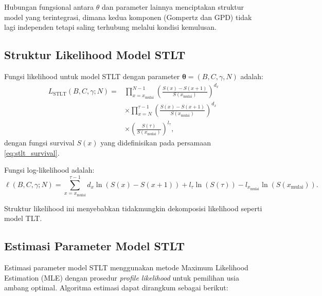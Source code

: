 Hubungan fungsional antara $\theta$ dan parameter lainnya menciptakan struktur model yang terintegrasi, dimana kedua komponen (Gompertz dan GPD) tidak lagi independen tetapi saling terhubung melalui kondisi kemulusan.

\subsection{Struktur Likelihood Model STLT}

Fungsi likelihood untuk model STLT dengan parameter $\boldsymbol{\theta} = (B, C, \gamma, N)$ adalah:
\begin{equation}
\begin{split}
L_{\text{STLT}}(B, C, \gamma; N) = &\prod_{x=x_{\text{mulai}}}^{N-1} \left(\frac{S(x) - S(x+1)}{S(x_{\text{mulai}})}\right)^{d_x} \\
&\times \prod_{x=N}^{\tau-1} \left(\frac{S(x) - S(x+1)}{S(x_{\text{mulai}})}\right)^{d_x} \\
&\times \left(\frac{S(\tau)}{S(x_{\text{mulai}})}\right)^{l_\tau},
\end{split}
\label{eq:stlt_likelihood}
\end{equation}
dengan fungsi survival $S(x)$ yang didefinisikan pada persamaan \eqref{eq:stlt_survival}.

Fungsi log-likelihood adalah:
\begin{equation}
\ell(B, C, \gamma; N) = \sum_{x=x_{\text{mulai}}}^{\tau-1} d_x \ln(S(x) - S(x+1)) + l_\tau \ln(S(\tau)) - l_{x_{\text{mulai}}} \ln(S(x_{\text{mulai}})).
\label{eq:stlt_loglikelihood}
\end{equation}

Struktur likelihood ini menyebabkan tidakmungkin dekomposisi likelihood seperti model TLT.

\subsection{Estimasi Parameter Model STLT}

Estimasi parameter model STLT menggunakan metode Maximum Likelihood Estimation (MLE) dengan prosedur \textit{profile likelihood} untuk pemilihan usia ambang optimal. Algoritma estimasi dapat dirangkum sebagai berikut:

